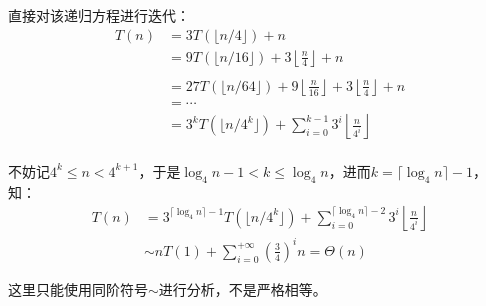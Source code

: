 \documentclass[12pt,a4paper,violet]{bbe}
\begin{document}
\begin{solution}
	直接对该递归方程进行迭代：
	$$
	\begin{array}{rl}
		T(n)&=3T(\lfloor n/4\rfloor)+n\\
		&=9T(\lfloor n/16\rfloor)+3\left\lfloor \frac{n}{4}\right\rfloor +n\\
		&\\
		&=27T(\lfloor n/64\rfloor)+9\left\lfloor \frac{n}{16}\right\rfloor+3\left\lfloor \frac{n}{4}\right\rfloor+n\\
		&=\cdots\\
		&=3^kT(\lfloor n/4^k\rfloor)+\sum\limits_{i=0}^{k-1}3^i\left\lfloor \frac{n}{4^i}\right\rfloor\\
	\end{array}
	$$
	
	不妨记$4^k\leqslant n<4^{k+1}$，于是$\log_4n-1<k\leqslant\log_4n$，进而$k=\lceil\log_4 n\rceil-1$，知：
	$$
	\begin{array}{rl}
		T(n)&=3^{\lceil\log_4 n\rceil-1}T(\lfloor n/4^k\rfloor)+\sum\limits_{i=0}^{\lceil\log_4 n\rceil-2}3^i\left\lfloor \frac{n}{4^i}\right\rfloor\\
		&\sim nT(1)+\sum\limits_{i=0}^{+\infty}\left(\frac{3}{4}\right)^in=\Theta(n)
	\end{array}
	$$
	
	这里只能使用同阶符号$\sim$进行分析，不是严格相等。
\end{solution}
\end{document}
